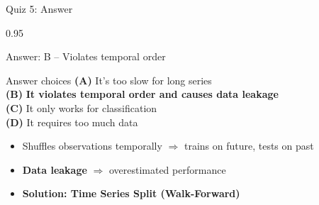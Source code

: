 \documentclass[9pt, aspectratio=169, t]{beamer}
\begin{document}
\begin{frame}{Quiz 5: Answer}
    \begin{cminipage}{0.95\textwidth}
    {\footnotesize
    \begin{exampleblock}{Answer: B -- Violates temporal order}
    \begin{block}{Answer choices}
        \textcolor{MainBlue}{\textbf{(A)}} It's too slow for long series \incorrect\\[1pt]
        \textcolor{MainBlue}{\textbf{(B)}} \textbf{\textcolor{Forest}{It violates temporal order and causes data leakage}} \correct\\[1pt]
        \textcolor{MainBlue}{\textbf{(C)}} It only works for classification \incorrect\\[1pt]
        \textcolor{MainBlue}{\textbf{(D)}} It requires too much data \incorrect
    \end{block}

        \vspace{0.1cm}

        \begin{itemize}\setlength{\itemsep}{0pt}
            \item Shuffles observations temporally $\Rightarrow$ trains on future, tests on past
            \item \textbf{Data leakage} $\Rightarrow$ overestimated performance
            \item \textbf{Solution: Time Series Split (Walk-Forward)}
        \end{itemize}
        \begin{center}
        \vspace{-0.1cm}
        \end{center}
    \end{exampleblock}
    }
    \end{cminipage}
\end{frame}
\end{document}
